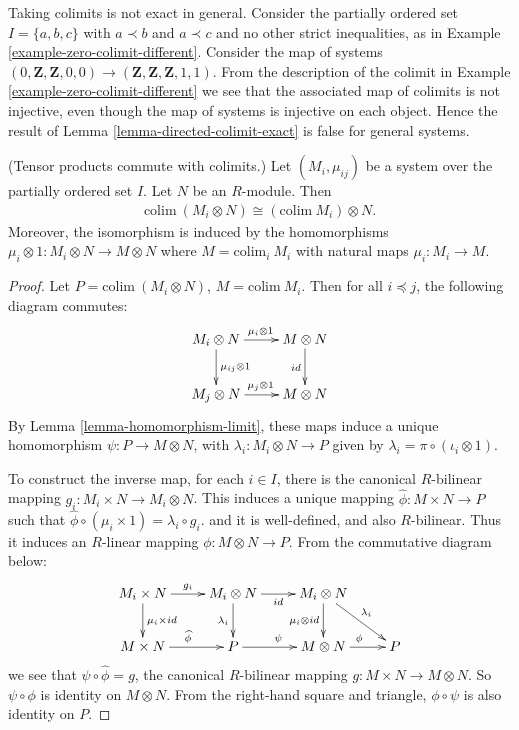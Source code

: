 \begin{example}
\label{example-colimit-not-exact}
Taking colimits is not exact in general.
Consider the partially ordered set $I = \{a, b, c\}$ with
$a \prec b$ and $a \prec c$ and no other strict inequalities,
as in Example \ref{example-zero-colimit-different}.
Consider the map of systems
$(0, \mathbf{Z}, \mathbf{Z}, 0, 0) \to
(\mathbf{Z}, \mathbf{Z}, \mathbf{Z}, 1, 1)$.
From the description of the colimit in
Example \ref{example-zero-colimit-different}
we see that the associated map of colimits is not injective,
even though the map of systems is injective on each object.
Hence the result of Lemma \ref{lemma-directed-colimit-exact}
is false for general systems.
\end{example}

\begin{lemma}
\label{lemma-tensor-products-commute-with-limits}
(Tensor products commute with colimits.)
Let $(M_i, \mu_{ij})$ be a system over the partially ordered set $I$.
Let $N$ be an $R$-module. Then
\begin{align}
\text{colim}\ (M_i\otimes N) \cong (\text{colim}\ M_i)\otimes N.
\end{align}
Moreover, the isomorphism is induced by the homomorphisms
$\mu_i\otimes 1: M_i\otimes N \rightarrow M\otimes N$
where $M = \text{colim}_i\ M_i$ with natural maps $\mu_i : M_i \to M$.
\end{lemma}

\begin{proof}
Let $P = \text{colim}\ (M_i\otimes N)$, $M = \text{colim}\ M_i$.
Then for all $i\preceq j$, the
following diagram commutes:
$$
\xymatrix{
    M_i\otimes N \ar[r]^{\mu_{i}\otimes 1} \ar[d]^{\mu_{ij}\otimes 1}&M\otimes
N\ar[d]_{id} \\
    M_j\otimes N \ar[r]^{\mu_{j}\otimes 1} &M\otimes N
}
$$
By Lemma \ref{lemma-homomorphism-limit},
these maps induce a unique homomorphism
$\psi : P\rightarrow M\otimes N$, with
$\lambda_{i} : M_i\otimes
N\rightarrow P$ given by $\lambda_{i} = \pi \circ (\iota_{i}\otimes 1)$.

\medskip\noindent
To construct the inverse map, for each $i\in I$, there is the canonical
$R$-bilinear mapping $g_i : M_i\times N\rightarrow
M_i \otimes N$. This induces a unique mapping
$\widehat{\phi} : M\times N\rightarrow P$
such that $\widehat{\phi}\circ
(\mu_i\times 1) = \lambda_i\circ g_i$. and it is well-defined, and also
$R$-bilinear. Thus it induces an
$R$-linear mapping $\phi: M\otimes N\rightarrow P$.
From the commutative diagram below:
$$
\xymatrix{
    M_i\times N \ar[r]^{g_i} \ar[d]^{\mu_{i}\times id}&M_i\otimes N\ar[r]_{id}
\ar[d]_{\lambda_i}
    &M_i\otimes N \ar[d]_{\mu_i\otimes id} \ar[rd]^{\lambda_i}\\
    M\times N \ar[r]^{\widehat{\phi}} &P \ar[r]^{\psi} &M\otimes N
\ar[r]^{\phi} &P
    }
$$
we see that $\psi\circ\widehat{\phi} = g$, the canonical $R$-bilinear mapping
$g : M\times N\rightarrow M\otimes N$. So
$\psi\circ\phi$ is identity on $M\otimes N$. From the right-hand square and
triangle, $\phi\circ\psi$ is also
identity on $P$.
\end{proof}


